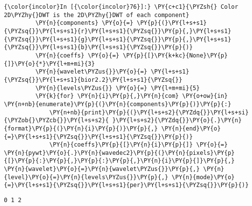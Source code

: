     \begin{Verbatim}[commandchars=\\\{\}]
{\color{incolor}In [{\color{incolor}76}]:} \PY{c+c1}{\PYZsh{} Color 2D\PYZhy{}DWT is the 2D\PYZhy{}DWT of each component}
         \PY{n}{components} \PY{o}{=} \PY{p}{(}\PY{l+s+s1}{\PYZsq{}}\PY{l+s+s1}{r}\PY{l+s+s1}{\PYZsq{}}\PY{p}{,}\PY{l+s+s1}{\PYZsq{}}\PY{l+s+s1}{g}\PY{l+s+s1}{\PYZsq{}}\PY{p}{,}\PY{l+s+s1}{\PYZsq{}}\PY{l+s+s1}{b}\PY{l+s+s1}{\PYZsq{}}\PY{p}{)}
         \PY{n}{coeffs} \PY{o}{=} \PY{p}{[}\PY{k+kc}{None}\PY{p}{]}\PY{o}{*}\PY{l+m+mi}{3}
         \PY{n}{wavelet\PYZus{}}\PY{o}{=} \PY{l+s+s1}{\PYZsq{}}\PY{l+s+s1}{bior2.2}\PY{l+s+s1}{\PYZsq{}}
         \PY{n}{levels\PYZus{}} \PY{o}{=} \PY{l+m+mi}{5}
         \PY{k}{for} \PY{n}{i}\PY{p}{,}\PY{n}{com} \PY{o+ow}{in} \PY{n+nb}{enumerate}\PY{p}{(}\PY{n}{components}\PY{p}{)}\PY{p}{:}
             \PY{n+nb}{print}\PY{p}{(}\PY{l+s+s2}{\PYZdq{}}\PY{l+s+si}{\PYZob{}\PYZcb{}}\PY{l+s+s2}{ }\PY{l+s+s2}{\PYZdq{}}\PY{o}{.}\PY{n}{format}\PY{p}{(}\PY{n}{i}\PY{p}{)}\PY{p}{,} \PY{n}{end}\PY{o}{=}\PY{l+s+s1}{\PYZsq{}}\PY{l+s+s1}{\PYZsq{}}\PY{p}{)}
             \PY{n}{coeffs}\PY{p}{[}\PY{n}{i}\PY{p}{]} \PY{o}{=} \PY{n}{pywt}\PY{o}{.}\PY{n}{wavedec2}\PY{p}{(}\PY{n}{pixels}\PY{p}{[}\PY{p}{:}\PY{p}{,}\PY{p}{:}\PY{p}{,}\PY{n}{i}\PY{p}{]}\PY{p}{,} \PY{n}{wavelet}\PY{o}{=}\PY{n}{wavelet\PYZus{}}\PY{p}{,} \PY{n}{level}\PY{o}{=}\PY{n}{levels\PYZus{}}\PY{p}{,} \PY{n}{mode}\PY{o}{=}\PY{l+s+s1}{\PYZsq{}}\PY{l+s+s1}{per}\PY{l+s+s1}{\PYZsq{}}\PY{p}{)}
\end{Verbatim}


    \begin{Verbatim}[commandchars=\\\{\}]
0 1 2 
    \end{Verbatim}

